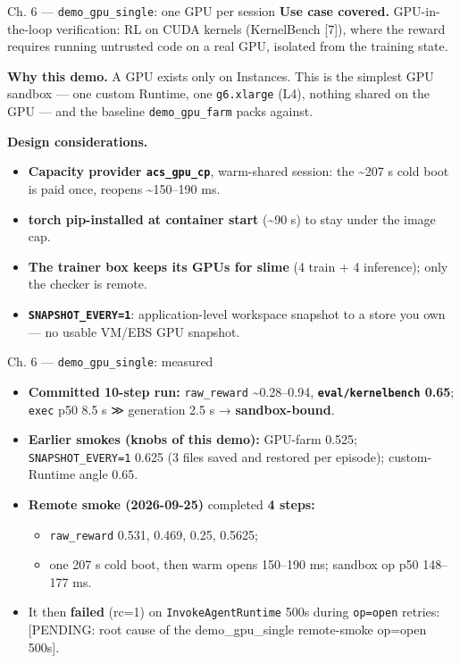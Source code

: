 \documentclass[
  10pt,
  ignorenonframetext,
  aspectratio=169,
  t]{beamer}
\providecommand{\tightlist}{%
  \setlength{\itemsep}{0pt}\setlength{\parskip}{0pt}}
\begin{document}
\begin{frame}{Ch. 6 --- \texttt{demo\_gpu\_single}: one GPU per
session}
\protect\hypertarget{ch.-6-demo_gpu_single-one-gpu-per-session}{}
\textbf{Use case covered.} GPU-in-the-loop verification: RL on CUDA
kernels (KernelBench {[}7{]}), where the reward requires running
untrusted code on a real GPU, isolated from the training state.

\textbf{Why this demo.} A GPU exists only on Instances. This is the
simplest GPU sandbox --- one custom Runtime, one \texttt{g6.xlarge}
(L4), nothing shared on the GPU --- and the baseline
\texttt{demo\_gpu\_farm} packs against.

\textbf{Design considerations.}

\begin{itemize}
\tightlist
\item
  \textbf{Capacity provider \texttt{acs\_gpu\_cp}}, warm-shared session:
  the \textasciitilde207 s cold boot is paid once, reopens
  \textasciitilde150--190 ms.
\item
  \textbf{torch pip-installed at container start} (\textasciitilde90 s)
  to stay under the image cap.
\item
  \textbf{The trainer box keeps its GPUs for slime} (4 train + 4
  inference); only the checker is remote.
\item
  \textbf{\texttt{SNAPSHOT\_EVERY=1}}: application-level workspace
  snapshot to a store you own --- no usable VM/EBS GPU snapshot.
\end{itemize}
\end{frame}

\begin{frame}{Ch. 6 --- \texttt{demo\_gpu\_single}: measured}
\protect\hypertarget{ch.-6-demo_gpu_single-measured}{}
\begin{itemize}
\tightlist
\item
  \textbf{Committed 10-step run:} \texttt{raw\_reward}
  \textasciitilde0.28--0.94, \textbf{\texttt{eval/kernelbench} 0.65};
  \texttt{exec} p50 8.5 s ≫ generation 2.5 s → \textbf{sandbox-bound}.
\item
  \textbf{Earlier smokes (knobs of this demo):} GPU-farm 0.525;
  \texttt{SNAPSHOT\_EVERY=1} 0.625 (3 files saved and restored per
  episode); custom-Runtime angle 0.65.
\item
  \textbf{Remote smoke (2026-09-25)} completed \textbf{4 steps:}

  \begin{itemize}
  \tightlist
  \item
    \texttt{raw\_reward} 0.531, 0.469, 0.25, 0.5625;
  \item
    one 207 s cold boot, then warm opens 150--190 ms; sandbox op p50
    148--177 ms.
  \end{itemize}
\item
  It then \textbf{failed} (rc=1) on \texttt{InvokeAgentRuntime} 500s
  during \texttt{op=open} retries: {[}PENDING: root cause of the
  demo\_gpu\_single remote-smoke op=open 500s{]}.
\end{itemize}
\end{frame}
\end{document}
